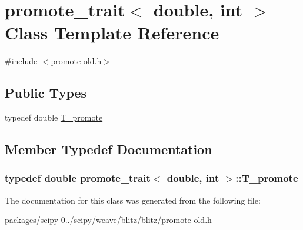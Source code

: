 \hypertarget{classpromote__trait_3_01double_00_01int_01_4}{}\section{promote\+\_\+trait$<$ double, int $>$ Class Template Reference}
\label{classpromote__trait_3_01double_00_01int_01_4}


{\ttfamily \#include $<$promote-\/old.\+h$>$}

\subsection*{Public Types}
\begin{DoxyCompactItemize}
\item 
typedef double \hyperlink{classpromote__trait_3_01double_00_01int_01_4_a86ed3150ffaa057868a9406321282d81}{T\+\_\+promote}
\end{DoxyCompactItemize}


\subsection{Member Typedef Documentation}
\hypertarget{classpromote__trait_3_01double_00_01int_01_4_a86ed3150ffaa057868a9406321282d81}{}
\subsubsection[{T\+\_\+promote}]{\setlength{\rightskip}{0pt plus 5cm}typedef double {\bf promote\+\_\+trait}$<$ double, int $>$\+::{\bf T\+\_\+promote}}\label{classpromote__trait_3_01double_00_01int_01_4_a86ed3150ffaa057868a9406321282d81}


The documentation for this class was generated from the following file\+:\begin{DoxyCompactItemize}
\item 
packages/scipy-\/0../scipy/weave/blitz/blitz/\hyperlink{promote-old_8h}{promote-\/old.\+h}\end{DoxyCompactItemize}
